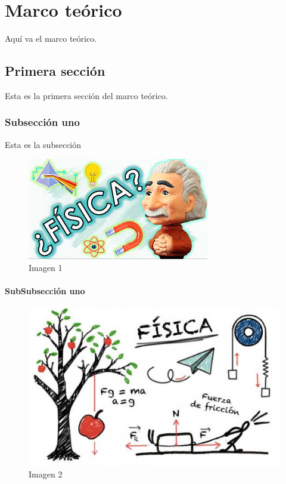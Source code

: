 \chapter{Marco teórico}
Aquí va el marco teórico.

\section{Primera sección}
Esta es la primera sección del marco teórico.
	\subsection{Subsección uno}
	Esta es la subsección
	\begin{figure}[htb]
	\centering
	\includegraphics[scale=0.4]{Img/1.png}
	\caption{Imagen 1}
	\end{figure}
		\subsubsection{SubSubsección uno}
	\begin{figure}[htb]
	\centering
	\includegraphics[scale=0.4]{Img/2.png}
	\caption{Imagen 2}
	\end{figure}
